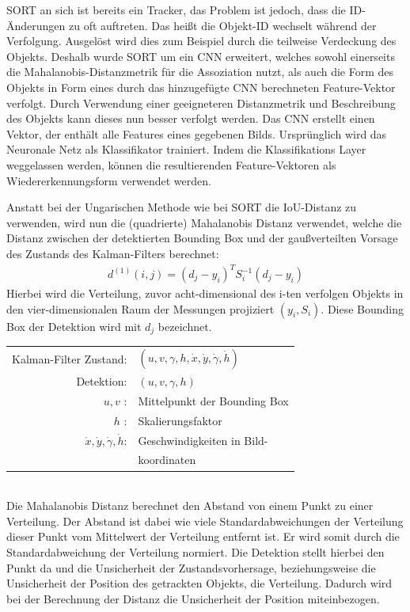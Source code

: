 \documentclass[conference]{IEEEtran}
\begin{document}
	SORT an sich ist bereits ein Tracker, das Problem ist jedoch, dass die ID-Änderungen zu oft auftreten. Das heißt die Objekt-ID wechselt während der Verfolgung. Ausgelöst wird dies zum Beispiel durch die teilweise Verdeckung des Objekts. Deshalb wurde SORT um ein CNN erweitert, welches sowohl einerseits die Mahalanobis-Distanzmetrik für die Assoziation nutzt, als auch die Form des Objekts in Form eines durch das hinzugefügte CNN berechneten Feature-Vektor verfolgt. Durch Verwendung einer geeigneteren Distanzmetrik und Beschreibung des Objekts kann dieses nun besser verfolgt werden.
	Das CNN erstellt einen Vektor, der enthält alle Features eines gegebenen Bilds. Ursprünglich wird das Neuronale Netz als Klassifikator trainiert. Indem die Klassifikations Layer weggelassen werden, können die resultierenden Feature-Vektoren als Wiedererkennungsform verwendet werden.
	
	Anstatt bei der Ungarischen Methode wie bei SORT die IoU-Distanz zu verwenden, wird nun die (quadrierte) Mahalanobis Distanz verwendet, welche die Distanz zwischen der detektierten Bounding Box und der gaußverteilten Vorsage des Zustands des Kalman-Filters berechnet:
	\begin{align}
	d^{(1)}(i,j)= (d_j - y_i)^TS^{-1}_i(d_j - y_i)
	\end{align}
	Hierbei wird die Verteilung, zuvor acht-dimensional des i-ten verfolgen Objekts in den vier-dimensionalen Raum der Messungen projiziert $(y_i, S_i)$. Diese Bounding Box der Detektion wird mit $d_j$ bezeichnet. \\
	
	
	\begin{tabular}{r l}
		Kalman-Filter Zustand: & $(u,v,\gamma,h,\dot{x},\dot{y},\dot{\gamma},\dot{h})$ \\
		Detektion: & $(u,v,\gamma,h)$ \\
		$u,v$ :& Mittelpunkt der Bounding Box \\
		$h$ :& Skalierungsfaktor \\
		$\dot{x},\dot{y},\dot{\gamma},\dot{h}$: & Geschwindigkeiten in Bild- \\	
		& koordinaten \\
	\end{tabular} \\

	Die Mahalanobis Distanz berechnet den Abstand von einem Punkt zu einer Verteilung. Der Abstand ist dabei wie viele Standardabweichungen der Verteilung dieser Punkt vom Mittelwert der Verteilung entfernt ist. Er wird somit durch die Standardabweichung der Verteilung normiert. Die Detektion stellt hierbei den Punkt da und die Unsicherheit der Zustandsvorhersage, beziehungsweise die Unsicherheit der Position des getrackten Objekts, die Verteilung. Dadurch wird bei der Berechnung der Distanz die Unsicherheit der Position miteinbezogen.
	
\end{document}
